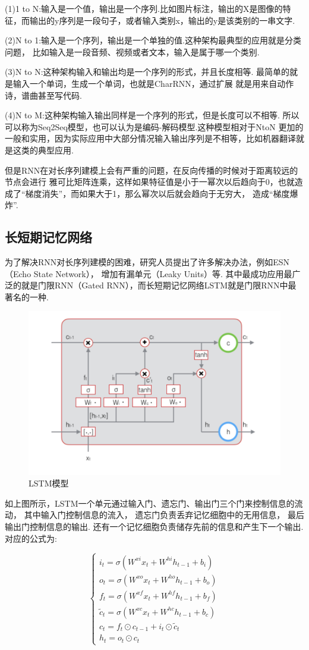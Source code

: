 \documentclass[bachelor,adobefonts]{jnuthesis}
\begin{document}
(1)1 to N:输入是一个值，输出是一个序列.比如图片标注，输出的X是图像的特征，而输出的y序列是一段句子，或者输入类别x，输出的y是该类别的一串文字.

(2)N to 1:输入是一个序列，输出是一个单独的值.这种架构最典型的应用就是分类问题，
比如输入是一段音频、视频或者文本，输入是属于哪一个类别.


(3)N to N:这种架构输入和输出均是一个序列的形式，并且长度相等.
最简单的就是输入一个单词，生成一个单词，也就是CharRNN，通过扩展
就是用来自动作诗，谱曲甚至写代码.

(4)N to M:这种架构输入输出同样是一个序列的形式，但是长度可以不相等.
所以可以称为Seq2Seq模型，也可以认为是编码-解码模型.这种模型相对于NtoN
更加的一般和实用，因为实际应用中大部分情况输入输出序列是不相等，比如机器翻译就是这类的典型应用.

但是RNN在对长序列建模上会有严重的问题，在反向传播的时候对于距离较远的节点会进行
雅可比矩阵连乘，这样如果特征值是小于一幂次以后趋向于0，也就造成了“梯度消失”，而如果大于1，那么幂次以后就会趋向于无穷大，
造成“梯度爆炸”.

\subsection{长短期记忆网络}
为了解决RNN对长序列建模的困难，研究人员提出了许多解决办法，例如ESN（Echo State Network），
增加有漏单元（Leaky Units）等.
其中最成功应用最广泛的就是门限RNN（Gated RNN），而长短期记忆网络LSTM就是门限RNN中最著名的一种.

\begin{figure}[h!]
  \centering
  \includegraphics[width=0.6\linewidth]{LSTM.png}
  \caption{LSTM模型}
\end{figure}

如上图所示，LSTM一个单元通过输入门、遗忘门、输出门三个门来控制信息的流动，
其中输入门控制信息的流入，
遗忘门负责丢弃记忆细胞中的无用信息，
最后输出门控制信息的输出.
还有一个记忆细胞负责储存先前的信息和产生下一个输出.
对应的公式为:

\begin{equation}
  \left\{
  \begin{array}{l}
   i_{t} = \sigma(W^{xi}x_{t}+W^{hi}h_{t-1}+b_{i}) \\ 
   o_{t} = \sigma(W^{xo}x_{t}+W^{ho}h_{t-1}+b_{o}) \\ 
   f_{t} = \sigma(W^{xf}x_{t}+W^{hf}h_{t-1}+b_{f}) \\ 
   \widetilde{c}_{t} = \sigma(W^{xc}x_{t}+W^{hc}h_{t-1}+b_{c}) \\
   c_{t} = f_{t} \odot c_{t-1} + i_{t} \odot \widetilde{c}_{t} \\
   h_{t} = o_{t} \odot c_{t}
  \end{array}
  \right.
\end{equation}
\end{document}
